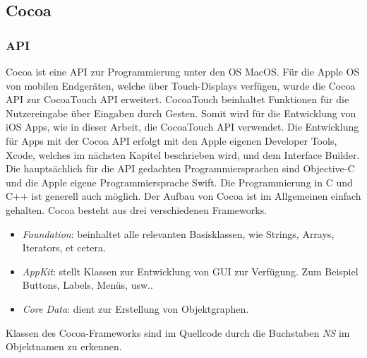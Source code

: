 \subsection{Cocoa}
\subsubsection{\acf{API}}
Cocoa ist eine \acf{API} zur Programmierung unter den \acf{OS} MacOS. Für die Apple \acs{OS} von mobilen Endgeräten, welche über Touch-Displays verfügen, wurde die Cocoa \acs{API} zur CocoaTouch \acs{API} erweitert. CocoaTouch beinhaltet Funktionen für die Nutzereingabe über Eingaben durch Gesten. Somit wird für die Entwicklung von iOS Apps, wie in dieser Arbeit, die CocoaTouch \acs{API} verwendet.
\newline
Die Entwicklung für Apps mit der Cocoa \acs{API} erfolgt mit den Apple eigenen Developer Tools, Xcode, welches im nächsten Kapitel beschrieben wird, und dem Interface Builder. 
\newline
Die hauptsächlich für die \acs{API} gedachten Programmiersprachen sind Objective-C und die Apple eigene Programmiersprache Swift. Die Programmierung in C und C++ ist generell auch möglich. 
\newline
Der Aufbau von Cocoa ist im Allgemeinen einfach gehalten. Cocoa besteht aus drei verschiedenen Frameworks.
\begin{itemize}
	\item \textit{Foundation}: beinhaltet alle relevanten Basisklassen, wie Strings, Arrays, Iterators, et cetera.
	\item \textit{AppKit}: stellt Klassen zur Entwicklung von \acf{GUI} zur Verfügung. Zum Beispiel Buttons, Labels, Menüs, usw..  
	\item \textit{Core Data}: dient zur Erstellung von Objektgraphen.
\end{itemize}
Klassen des Cocoa-Frameworks sind im Quellcode durch die Buchstaben \emph{NS} im Objektnamen zu erkennen. 
